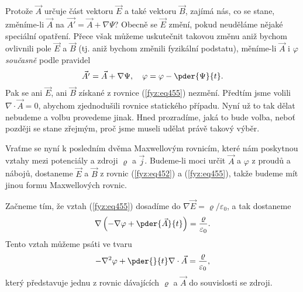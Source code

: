   Protože \(\vec{A}\) určuje část vektoru \(\vec{E}\) a také vektoru \(\vec{B}\), zajímá nás, co se 
  stane, změníme-li \(\vec{A}\) na \(\vec{A'} =\vec{A} +\nabla\Psi\)? Obecně se \(\vec{E}\) změní, 
  pokud neuděláme nějaké speciální opatření. Přece však můžeme uskutečnit 
  takovou změnu aniž bychom ovlivnili pole \(\vec{E}\) a \(\vec{B}\) (tj. aniž bychom změnili 
  fyzikální podstatu), měníme-li \(\vec{A}\) i \(\varphi\) \emph{současně} podle pravidel
  \begin{equation}\label{fyz:eq456}
    \vec{A'} =\vec{A} +\nabla\Psi, \quad \varphi = \varphi - \pder{\Psi}{t}.
  \end{equation} 
  Pak se ani \(\vec{E}\), ani \(\vec{B}\) získané z rovnice (\ref{fyz:eq455}) nezmění. Předtím jsme 
  volili \(\nabla\cdot\vec{A} = 0\), abychom zjednodušili rovnice statického případu. Nyní už to 
  tak dělat nebudeme a volbu provedeme jinak. Hned prozradíme, jaká to bude volba, neboť později se 
  stane zřejmým, proč jsme museli udělat právě takový výběr. 
  
  Vraťme se nyní k posledním dvěma Maxwellovým rovnicím, které nám poskytnou vztahy mezi potenciály 
  a zdroji \(\varrho\) a \(\vec{j}\). Budeme-li moci určit \(\vec{A}\) a \(\varphi\) z proudů a 
  nábojů, dostaneme \(\vec{E}\) a \(\vec{B}\) z rovnic (\ref{fyz:eq452}) a (\ref{fyz:eq455}), takže 
  budeme mít jinou formu Maxwellových rovnic. 
  
  Začneme tím, že vztah (\ref{fyz:eq455}) dosadíme do \(\nabla\vec{E} = \varrho/\varepsilon_0\), a 
  tak dostaneme
  \begin{equation}\label{fyz:eq457}
    \nabla\left(-\nabla\varphi + \pder{\vec{A}}{t}\right) = \frac{\varrho}{\varepsilon_0}.
  \end{equation}  
  Tento vztah můžeme psáti ve tvaru
  \begin{equation}\label{fyz:eq458}
    -\nabla^2\varphi + \pder{ }{t}\nabla\cdot\vec{A} = \frac{\varrho}{\varepsilon_0},
  \end{equation}
  který představuje jednu z rovnic dávajících \(\varrho\) a \(\vec{A}\) do souvislosti se zdroji. 
  
